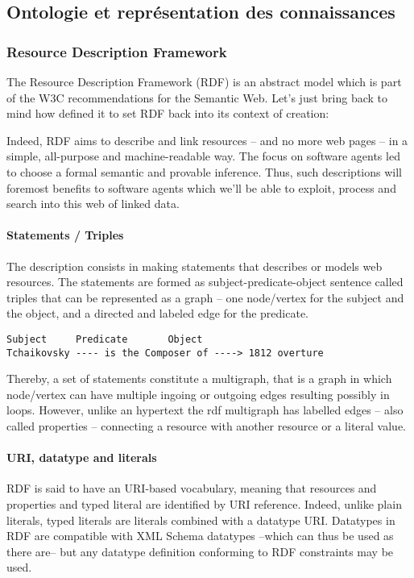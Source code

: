 \subsection{Ontologie et représentation des connaissances}
\subsubsection*{Resource Description Framework}
The Resource  Description Framework (RDF) is an abstract model which is part of the W3C recommendations for the Semantic Web. 
Let's just bring back to mind how  defined it to set RDF back into its context of creation: 


Indeed, RDF aims to describe and link resources – and no more web pages – in a simple, all-purpose and machine-readable way. 
The focus on software agents led to choose a formal semantic and provable inference. 
Thus, such descriptions will foremost benefits to software agents which we'll be able to exploit, process and search into this web of linked data. 

\paragraph{Statements / Triples}
The description consists in making statements that describes or models web resources. The statements are formed as subject-predicate-object sentence called triples that can be represented as a graph – one node/vertex for the subject and the object, and a directed and labeled edge for the predicate. 
\begin{Verbatim}[fontsize=\small,formatcom=\color{black!70}]
Subject		Predicate	    Object	
Tchaikovsky ---- is the Composer of ----> 1812 overture
\end{Verbatim}
Thereby, a set of statements constitute a multigraph, that is a graph in which node/vertex can have multiple ingoing or outgoing edges resulting possibly in loops. 
However, unlike an hypertext the rdf multigraph has labelled edges – also called properties -- connecting a resource with another resource or a literal value.

\paragraph{URI, datatype and literals}
RDF is said to have an URI-based vocabulary, meaning that resources and properties and typed literal are identified by URI reference. 
Indeed, unlike plain literals, typed literals are literals combined with a datatype URI.
Datatypes in RDF are compatible with XML Schema datatypes --which can thus be used as there are-- but any datatype definition conforming to RDF constraints may be used.

